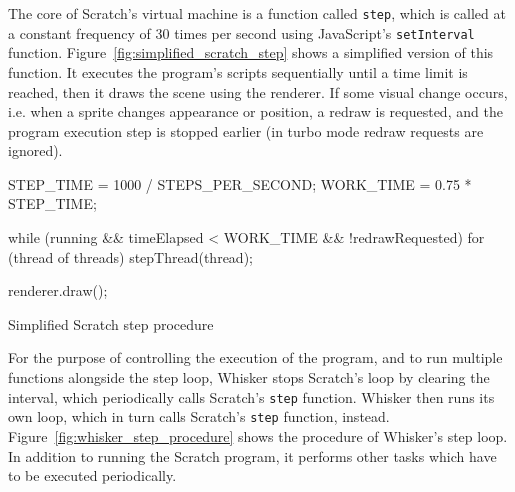 The core of Scratch's virtual machine is a function called \texttt{step},
which is called at a constant frequency of 30 times per second using JavaScript's \texttt{setInterval} function.
Figure~\ref{fig:simplified_scratch_step} shows a simplified version of this function.
It executes the program's scripts sequentially until a time limit is reached, then it draws the scene using the renderer.
If some visual change occurs, i.e. when a sprite changes appearance or position, a redraw is requested,
and the program execution step is stopped earlier (in turbo mode redraw requests are ignored).

\begin{listing}[htpb]
    \centering
    \begin{minipage}[t]{.5\textwidth}
        \begin{javascriptcode}
            STEP_TIME = 1000 / STEPS_PER_SECOND;
            WORK_TIME = 0.75 * STEP_TIME;

            while (running &&
                   timeElapsed < WORK_TIME &&
                   !redrawRequested) {
                for (thread of threads) {
                    stepThread(thread);
                }
            }

            renderer.draw();
        \end{javascriptcode}
    \end{minipage}
    \caption{Simplified Scratch step procedure}
    \label{fig:simplified_scratch_step}
\end{listing}

For the purpose of controlling the execution of the program, and to run multiple functions alongside the step loop,
Whisker stops Scratch's loop by clearing the interval, which periodically calls Scratch's \texttt{step} function.
Whisker then runs its own loop, which in turn calls Scratch's \texttt{step} function, instead.
Figure~\ref{fig:whisker_step_procedure} shows the procedure of Whisker's step loop.
In addition to running the Scratch program, it performs other tasks which have to be executed periodically.
\parspace

